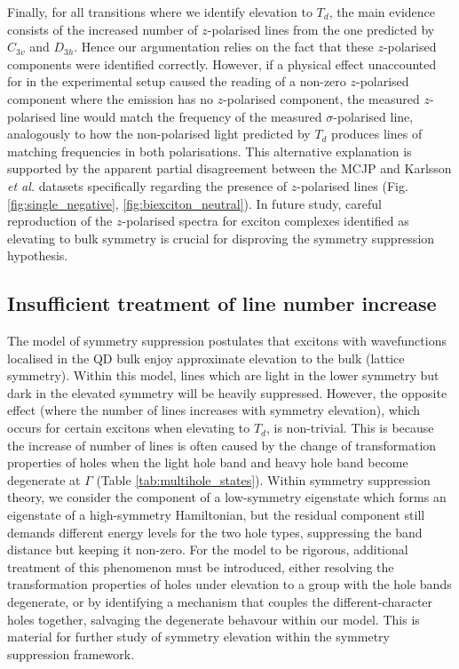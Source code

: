 Finally, for all transitions where we identify elevation to $T_d$, the main evidence consists of the increased number of $z$-polarised lines from the one predicted by $C_{3v}$ and $D_{3h}$. Hence our argumentation relies on the fact that these $z$-polarised components were identified correctly. However, if a physical effect unaccounted for in the experimental setup caused the reading of a non-zero $z$-polarised component where the emission has no $z$-polarised component, the measured $z$-polarised line would match the frequency of the measured $\sigma$-polarised line, analogously to how the non-polarised light predicted by $T_d$ produces lines of matching frequencies in both polarisations. This alternative explanation is supported by the apparent partial disagreement between the MCJP and Karlsson \textit{et al.} datasets specifically regarding the presence of $z$-polarised lines (Fig. \ref{fig:single_negative}, \ref{fig:biexciton_neutral}). In future study, careful reproduction of the $z$-polarised spectra for exciton complexes identified as elevating to bulk symmetry is crucial for disproving the symmetry suppression hypothesis.

\subsection{Insufficient treatment of line number increase} \label{sec:failed_degeneracy}
The model of symmetry suppression postulates that excitons with wavefunctions localised in the QD bulk enjoy approximate elevation to the bulk (lattice symmetry). Within this model, lines which are light in the lower symmetry but dark in the elevated symmetry will be heavily suppressed. However, the opposite effect (where the number of lines increases with symmetry elevation), which occurs for certain excitons when elevating to $T_d$, is non-trivial. This is because the increase of number of lines is often caused by the change of transformation properties of holes when the light hole band and heavy hole band become degenerate at $\Gamma$ (Table \ref{tab:multihole_states}). Within symmetry suppression theory, we consider the component of a low-symmetry eigenstate which forms an eigenstate of a high-symmetry Hamiltonian, but the residual component still demands different energy levels for the two hole types, suppressing the band distance but keeping it non-zero. For the model to be rigorous, additional treatment of this phenomenon must be introduced, either resolving the transformation properties of holes  under elevation to a group with the hole bands degenerate, or by identifying a mechanism that couples the different-character holes together, salvaging the degenerate behavour within our model. This is material for further study of symmetry elevation within the symmetry suppression framework.

